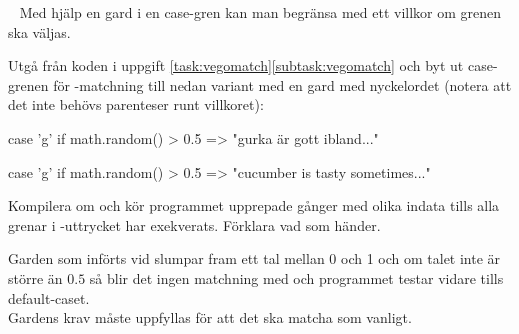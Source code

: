 \QUESTEND







\QUESTBEGIN

\Task  \what~  Med hjälp en gard  i en case-gren kan man begränsa med ett villkor om grenen ska väljas.

Utgå från koden i uppgift \ref{task:vegomatch}\ref{subtask:vegomatch} och byt ut case-grenen för -matchning till nedan variant med en gard med nyckelordet  (notera att det inte behövs parenteser runt villkoret):
\ifswedish
\begin{Code}
    case 'g' if math.random() > 0.5 => "gurka är gott ibland..."
\end{Code}
\else
\begin{Code}
    case 'g' if math.random() > 0.5 => "cucumber is tasty sometimes..."
\end{Code}
\fi
Kompilera om och kör programmet upprepade gånger med olika indata tills alla grenar i -uttrycket har exekverats. Förklara vad som händer.

\SOLUTION


\TaskSolved \what

Garden som införts vid  slumpar fram ett tal mellan 0 och 1 och om talet inte är större än $0.5$ så blir det ingen matchning med  och programmet testar vidare tills default-caset.\\
Gardens krav måste uppfyllas för att det ska matcha som vanligt.



\QUESTEND







\QUESTBEGIN


